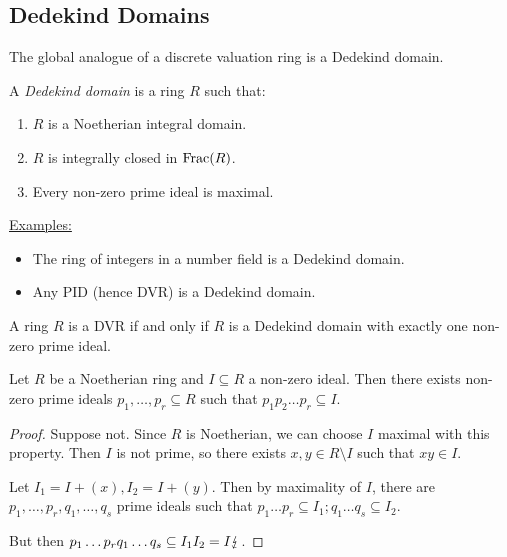 \documentclass[10pt,a4paper]{article}
\begin{document}
\subsection{Dedekind Domains}
The global analogue of a discrete valuation ring is a Dedekind domain.
\begin{definition}
  A \emph{Dedekind domain} is a ring $R$ such that:
  \begin{enumerate}
    \item $R$ is a Noetherian integral domain.
    \item $R$ is integrally closed in $\operatorname{Frac}(R)$.
    \item Every non-zero prime ideal is maximal.
  \end{enumerate}
\end{definition}
\underline{Examples:}
\begin{itemize}
  \item The ring of integers in a number field is a Dedekind domain.
  \item Any PID (hence DVR) is a Dedekind domain.
\end{itemize}
\begin{theorem}
  A ring $R$ is a DVR if and only if $R$ is a Dedekind domain with exactly one non-zero prime ideal.
\end{theorem}
\begin{lemma}
  Let $R$ be a Noetherian ring and $I \subseteq R$ a non-zero ideal. Then there exists non-zero prime ideals $p_1, \ldots, p_r \subseteq R$ such that $p_1p_2\ldots p_r \subseteq I$.
\end{lemma}
\begin{proof}
  Suppose not. Since $R$ is Noetherian, we can choose $I$ maximal with this property. Then $I$ is not prime, so there exists $x, y \in R\setminus I$ such that $xy \in I$.

  Let $I_1 = I+(x), I_2 = I+(y)$. Then by maximality of $I$, there are $p_1, \ldots, p_r, q_1, \ldots, q_s$ prime ideals such that $p_1\ldots p_r \subseteq I_1; q_1\ldots q_s \subseteq I_2$.

  But then $p_1\ldots p_rq_1\ldots q_s \subseteq I_1I_2 = I \lightning$.
\end{proof}
\end{document}
